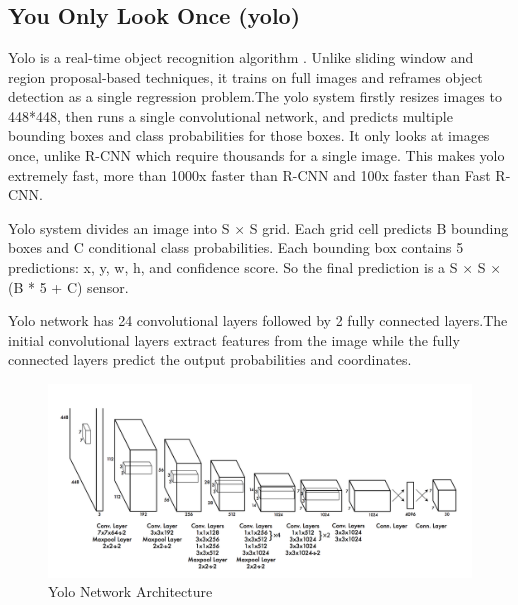 \section{}

\subsection{You Only Look Once (yolo)}
Yolo is a real-time object recognition algorithm \cite{yolo}. Unlike sliding window and region proposal-based techniques, it trains on full images and reframes object detection as a single regression problem.The yolo system firstly resizes images to 448*448, then runs a single convolutional network, and predicts multiple bounding boxes and class probabilities for those boxes. It only looks at images once, unlike R-CNN which require thousands for a single image. This makes yolo extremely fast, more than 1000x faster than R-CNN and 100x faster than Fast R-CNN. 

Yolo system divides an image into S × S grid. Each grid cell predicts B bounding boxes and C conditional class probabilities. Each bounding box contains 5 predictions: x, y, w, h, and confidence score. So the final prediction is a S × S × (B * 5 + C) sensor.

Yolo network has 24 convolutional layers followed by 2 fully connected layers.The initial convolutional layers extract features from the image while the fully connected layers predict the output probabilities and coordinates. 
\begin{figure}[H]
    \centering
    \includegraphics[width=1.0\linewidth]{img/yolo_network.png}
    \caption{Yolo Network Architecture}
\end{figure}%


